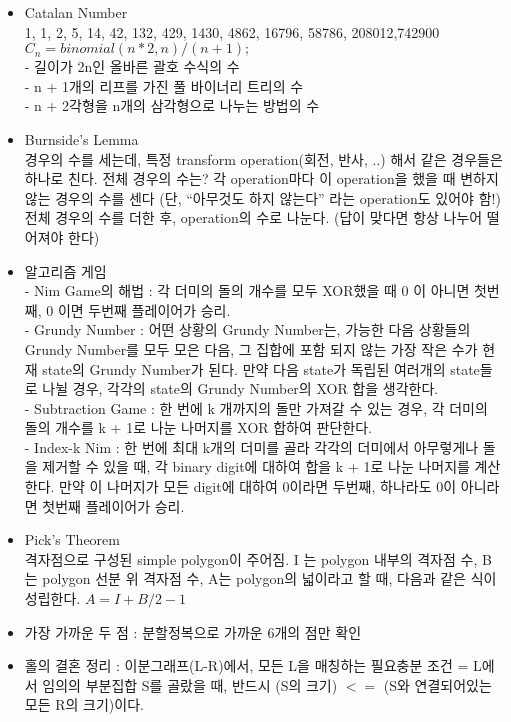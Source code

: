 \documentclass[landscape, 10pt, a4paper, oneside, twocolumn]{extarticle}
\begin{document}
\begin{itemize}
\item Catalan Number\\
1, 1, 2, 5, 14, 42, 132, 429, 1430, 4862, 16796, 58786, 208012,742900\\
$C_n = binomial(n * 2, n) / (n + 1);$\\
- 길이가 2n인 올바른 괄호 수식의 수\\
- n + 1개의 리프를 가진 풀 바이너리 트리의 수\\
- n + 2각형을 n개의 삼각형으로 나누는 방법의 수
\item Burnside’s Lemma\\
경우의 수를 세는데, 특정 transform operation(회전, 반사, ..) 해서 같은 경우들은 하나로 친다. 전체 경우의 수는? 각 operation마다 이 operation을 했을 때 변하지 않는 경우의 수를 센다 (단, “아무것도 하지 않는다” 라는 operation도 있어야 함!) 전체 경우의 수를 더한 후, operation의 수로 나눈다. (답이 맞다면 항상 나누어 떨어져야 한다)
\item 알고리즘 게임\\
- Nim Game의 해법 : 각 더미의 돌의 개수를 모두 XOR했을 때 0 이 아니면 첫번째, 0 이면 두번째 플레이어가 승리.\\
- Grundy Number : 어떤 상황의 Grundy Number는, 가능한 다음 상황들의 Grundy Number를 모두 모은 다음, 그 집합에 포함 되지 않는 가장 작은 수가 현재 state의 Grundy Number가 된다. 만약 다음 state가 독립된 여러개의 state들로 나뉠 경우, 각각의 state의 Grundy Number의 XOR 합을 생각한다.\\
- Subtraction Game : 한 번에 k 개까지의 돌만 가져갈 수 있는 경우, 각 더미의 돌의 개수를 k + 1로 나눈 나머지를 XOR 합하여 판단한다.\\
- Index-k Nim : 한 번에 최대 k개의 더미를 골라 각각의 더미에서 아무렇게나 돌을 제거할 수 있을 때, 각 binary digit에 대하여 합을 k + 1로 나눈 나머지를 계산한다. 만약 이 나머지가 모든 digit에 대하여 0이라면 두번째, 하나라도 0이 아니라면 첫번째 플레이어가 승리.
\item Pick’s Theorem\\
격자점으로 구성된 simple polygon이 주어짐. I 는 polygon 내부의 격자점 수, B 는 polygon 선분 위 격자점 수, A는 polygon의 넓이라고 할 때, 다음과 같은 식이 성립한다. $A=I+B/2-1$
\item 가장 가까운 두 점 : 분할정복으로 가까운 6개의 점만 확인
\item 홀의 결혼 정리 : 이분그래프(L-R)에서, 모든 L을 매칭하는 필요충분 조건 = L에서 임의의 부분집합 S를 골랐을 때, 반드시 (S의 크기) $<=$ (S와 연결되어있는 모든 R의 크기)이다.

\end{itemize}
\end{document}
